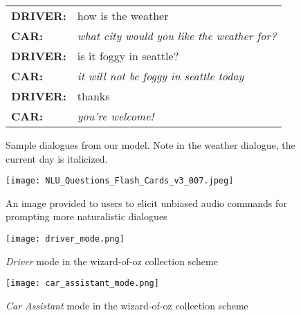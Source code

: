 \documentclass[11pt,a4paper]{article}
\begin{document}
\begin{figure*}
  \vspace{3mm}


  \begin{tabular}{ll}
    \bf DRIVER: & how is the weather\\
    \bf CAR: & \emph{what city would you like the weather for?} \\
    \bf DRIVER: & is it foggy in seattle?\\ 
    \bf CAR: & \emph{it will not be foggy in seattle today}\\
    \bf DRIVER: & thanks\\
    \bf CAR: & \emph{you're welcome!}\\
  \end{tabular}


  \caption{Sample dialogues from our model. Note in the weather dialogue, the current day is italicized.}
\end{figure*}



\begin{figure*}
    \caption{An image provided to users to elicit unbiased audio commands for prompting more naturalistic dialogues}
    \centering
    \texttt{[image: NLU\_Questions\_Flash\_Cards\_v3\_007.jpeg]}
\end{figure*} \vspace{1in}

\begin{figure*}
    \caption{\emph{Driver} mode in the wizard-of-oz collection scheme}
    \centering
    \texttt{[image: driver\_mode.png]} 
\end{figure*} \vspace{1in}

\begin{figure*}
    \caption{\emph{Car Assistant} mode in the wizard-of-oz collection scheme}
    \centering
    \texttt{[image: car\_assistant\_mode.png]}
\end{figure*}
\end{document}
